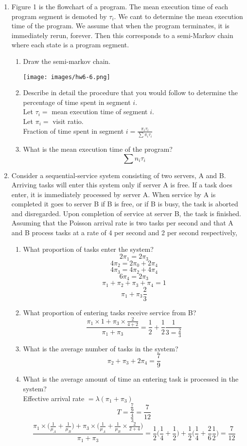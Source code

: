 \documentclass[10.5pt,letterpaper]{article}
\begin{document}
\begin{enumerate}[label=\textbf{Problem \arabic*.}]
\item Figure 1 is the flowchart of a program. The mean execution time of each program segment is demoted by $\tau_i$. We cant to determine the mean execution time of the program. We assume that when the program terminates, it is immediately rerun, forever. Then this corresponds to a semi-Markov chain where each state is a program segment.
	\begin{enumerate}[label=(\alph*)]
	\item Draw the semi-markov chain.
	\begin{center}\texttt{[image: images/hw6-6.png]}\end{center}
	\item Describe in detail the procedure that you would follow to determine the percentage of time spent in segment $i$.\\
	Let $\tau_i = $ mean execution time of segment $i$.\\
	Let $\pi_i = $ visit ratio.\\
	Fraction of time spent in segment $i = \boxed{\frac{\pi_i\tau_i}{\sum\pi_i\tau_i}}$
	\item What is the mean execution time of the program?
	\[\boxed{\sum n_i\tau_i}\]
	\end{enumerate}
\item Consider a sequential-service system consisting  of two servers, A and B. Arriving tasks will enter this system only if server A is free. If a task does enter, it is immediately
processed by server A. When service by A is completed it goes to server B if B is free, or if B is busy, the task is aborted and disregarded. Upon completion of service at server B, the
task is finished. Assuming that the Poisson arrival rate is two tasks per second and that A and B process tasks at a rate of 4 per second and 2 per second respectively,
	\begin{enumerate}[label=(\alph*)]
	\item What proportion of tasks enter the system?
	\[2\pi_1 = 2\pi_3\]
	\[4\pi_2 = 2\pi_0 + 2\pi_4\]
	\[4\pi_3 = 4\pi_2 + 4\pi_4\]
	\[6\pi_4 = 2\pi_3\]
	\[\pi_1+\pi_2+\pi_3+\pi_4=1\]
	\[\boxed{\pi_1+\pi_3 \frac{2}{3}}\]
	\item What proportion of entering tasks receive service from B?
	\[\frac{\pi_1\times1 + \pi_3\times\frac{2}{4+2}}{\pi_1+\pi_3} = \frac{1}{2} + \frac{1}{2}\frac{1}{3 = \boxed{\frac{2}{3}}}\]
	\item What is the average number of tasks in the system?
	\[\boxed{\pi_2+\pi_3+2\pi_4 = \frac{7}{9}}\]
	\item What is the average amount of time an entering task is processed in the system?\\
	Effective arrival rate $= \lambda(\pi_1+\pi_3)$
	\[T = \frac{\frac{7}{9}}{\frac{4}{3}}=\frac{7}{12}\]
	\[\frac{\pi_1\times\bigg(\frac{1}{\mu_A}+\frac{1}{\mu_B}\bigg) + \pi_3 \times \bigg(\frac{1}{\mu_A}+\frac{1}{\mu_B}\times\frac{2}{2+4}\bigg)}{\pi_1+\pi_3} = \frac{1}{2}\bigg(\frac{1}{4} + \frac{1}{2}\bigg) + \frac{1}{2}\bigg(\frac{1}{4} + \frac{2}{6}\frac{1}{2}\bigg)=\boxed{\frac{7}{12}}\]
	\end{enumerate}
\end{enumerate}
\end{document}
